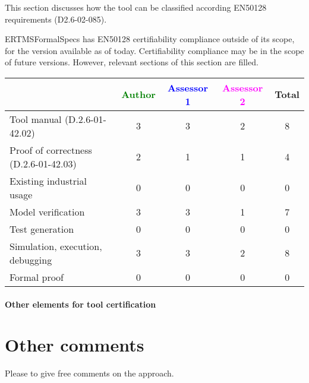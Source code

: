This section discusses how the tool can be classified according EN50128 requirements (D2.6-02-085).

\begin{author_comment}
ERTMSFormalSpecs has EN50128 certifiability compliance outside of its scope, for the version available as of today. Certifiability compliance may be in the scope of future versions. However, relevant sections of this section are filled.
\end{author_comment}

\begin{tabular}{|l | c | c | c | c|}
\hline
& \textcolor{green}{Author} & \textcolor{blue}{Assessor 1} & \textcolor{magenta}{Assessor 2} & Total \\
\hline 
Tool manual (D.2.6-01-42.02) & 3 & 3 & 2 & 8  \\
\hline
Proof of correctness (D.2.6-01-42.03) & 2 & 1 & 1 & 4 \\
\hline
Existing industrial  usage &  0 & 0 & 0 & 0 \\
\hline
Model verification & 3 & 3 & 1 & 7 \\
\hline
Test generation & 0 & 0 & 0 & 0 \\
\hline
Simulation, execution, debugging & 3 & 3 & 2 & 8 \\
\hline
Formal proof & 0 & 0 & 0 & 0 \\
\hline
\end{tabular}

\paragraph{Other elements for tool certification}

\section{Other comments}
Please to  give free comments on the approach.

